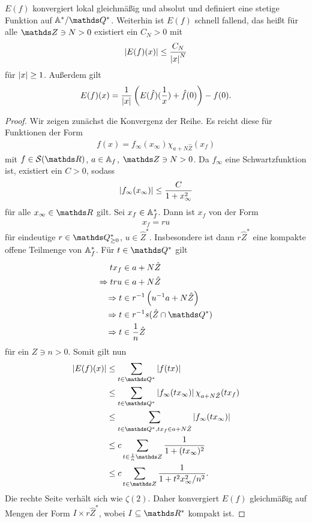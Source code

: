 \begin{prop}
$E(f)$ konvergiert lokal gleichmäßig und absolut und definiert eine
stetige Funktion auf $\A^\ast/\Q^\ast$.
Weiterhin ist $E(f)$ schnell fallend, das heißt für alle $\Z\ni N >0$ existiert ein $C_N>0$ mit
\begin{align*}
	\left\vert E(f)(x)\right\vert\leq \frac{C_N}{\left\vert x\right\vert^N}
\end{align*}
für $\left\vert x\right\vert\geq 1$.
Außerdem gilt
\begin{align*}
	E(f)(x)=\frac{1}{\left\vert x\right\vert}\left(E(\hat{f})(\frac{1}{x})+\hat{f}(0)\right) -f(0).
\end{align*}
\end{prop}
\begin{proof}
Wir zeigen zunächst die Konvergenz der Reihe.
Es reicht diese für Funktionen der Form
\begin{align*}
	f(x)=f_{\infty}(x_\infty)\chi_{a+N\hat{Z}}(x_f)
\end{align*}
mit $f\in \mathcal{S}(\R)$, $a \in \mathbb{A}_f$, $\Z \ni N>0$.
Da $f_\infty$ eine Schwartzfunktion ist, existiert ein $C>0$, sodass
\begin{align*}
	\left\vert f_\infty(x_\infty)\right\vert\leq \frac{C}{1+x_\infty^2}
\end{align*}
für alle $x_\infty \in \R$ gilt.
Sei $x_f \in \mathbb{A}_f^\ast$. Dann ist $x_f$ von der Form
\begin{align*}
	x_f=r u
\end{align*}
für eindeutige $r \in \Q_{\geq 0}^\ast$, $u \in \hat{Z} ^\ast$.
Insbesondere ist dann $r \hat{Z} ^\ast$ eine kompakte offene Teilmenge von $\mathbb{A}_f^\ast$.
Für $t \in \Q^\ast$ gilt
\begin{align*}
tx_f &\in a+N\hat{Z}\\
\Rightarrow tru &\in a+ N \hat{Z}\\
\Rightarrow t &\in r^{-1}\left(u^{-1}a+N\hat{Z}\right)\\
\Rightarrow t &\in r^{-1}s (\hat{Z}\cap \Q^\ast)\\
\Rightarrow t &\in \frac{1}{n}\hat{Z}
\end{align*}
für ein $Z \ni n>0$.
Somit gilt nun
\begin{align*}
\abs{E(f)(x)}&\leq \sum_{t \in \Q^\ast} \abs{f(tx)}\\
&\leq \sum_{t \in \Q^\ast} \abs{f_\infty(tx_\infty)}\chi_{a+N\hat{Z}}(tx_f)\\
&\leq \sum_{t \in \Q^\ast, tx_f \in a+N\hat{Z}} \abs{f_\infty(tx_\infty)}\\
&\leq c\sum_{t \in \frac{1}{n}\Z} \frac{1}{1+(tx_\infty)^2}\\
&\leq c\sum_{t\in \Z} \frac{1}{1+t^2x_\infty^2/n^2}.
\end{align*}
Die rechte Seite verhält sich wie $\zeta(2)$.
Daher konvergiert $E(f)$ gleichmäßig auf Mengen der Form $I \times r \hat{Z} ^\ast$, wobei $I \subseteq \R^\ast$ kompakt ist.


\end{proof}
